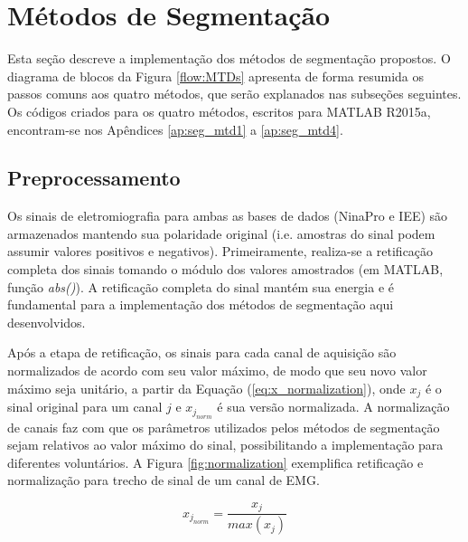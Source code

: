 

		\section{Métodos de Segmentação}
Esta seção descreve a implementação dos métodos de segmentação propostos. O diagrama de blocos da Figura \ref{flow:MTDs} apresenta de forma resumida os passos comuns aos quatro métodos, que serão explanados nas subseções seguintes. Os códigos criados para os quatro métodos, escritos para MATLAB R2015a, encontram-se nos Apêndices \ref{ap:seg_mtd1} a \ref{ap:seg_mtd4}.



			\subsection {Preprocessamento}

Os sinais de eletromiografia para ambas as bases de dados (NinaPro e IEE) são armazenados mantendo sua polaridade original (i.e. amostras do sinal podem assumir valores positivos e negativos). Primeiramente, realiza-se a retificação completa dos sinais tomando o módulo dos valores amostrados (em MATLAB, função \emph{abs()}). A retificação completa do sinal mantém sua energia e é fundamental para a implementação dos métodos de segmentação aqui desenvolvidos.

Após a etapa de retificação, os sinais para cada canal de aquisição são normalizados de acordo com seu valor máximo, de modo que seu novo valor máximo seja unitário, a partir da Equação (\ref{eq:x_normalization}), onde $x_j$ é o sinal original para um canal $j$ e $x_{j_{norm}}$ é sua versão normalizada. A normalização de canais faz com que os parâmetros utilizados pelos métodos de segmentação sejam relativos ao valor máximo do sinal, possibilitando a implementação para diferentes voluntários. A Figura \ref{fig:normalization} exemplifica retificação e normalização para trecho de sinal de um canal de EMG.

\begin{equation}
	\label{eq:x_normalization}
	x_{j_{norm}} = \frac{x_j}{max(x_j)}
\end{equation}

